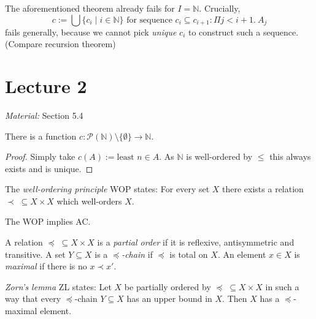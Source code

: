 \documentclass{whrartcl}
\newcommand{\NN}{\mathbb{N}}
\newcommand{\pow}{\mathcal{P}}
\begin{document}
\begin{remark}
  The aforementioned theorem already fails for $I = \NN$. Crucially,
  \[
    c := \bigcup \{c_i \mid i \in \NN\} \text{ for sequence } c_i \subseteq c_{i +
    1} : \Pi j < i + 1.~A_j
  \]
  fails generally, because we cannot pick \emph{unique} $c_i$ to construct such
  a sequence. (Compare recursion theorem)
\end{remark}


\newpage

\section{Lecture 2}

\emph{Material:} Section 5.4

\begin{theorem}
  There is a function $c : \pow(\NN) \setminus \{\emptyset\} \to \NN$.
\end{theorem}
\begin{proof}
  Simply take $c(A) := \text{least } n \in A$. As $\NN$ is well-ordered by
  $\leq$ this always exists and is unique.
\end{proof}


\begin{definition}
  The \emph{well-ordering principle} WOP states: For every set $X$ there exists
  a relation $\prec\; \subseteq X \times X$ which well-orders $X$.
\end{definition}

\begin{corollary}
  The WOP implies AC.
\end{corollary}


\begin{definition}
  A relation $\preceq\; \subseteq X \times X$ is a \emph{partial order} if it is
  reflexive, antisymmetric and transitive. A set $Y \subseteq X$ is a
  \emph{$\preceq$-chain} if $\preceq$ is total on $X$. An element $x \in X$ is
  \emph{maximal} if there is no $x \prec x'$.
\end{definition}

\begin{definition}
  \emph{Zorn's lemma} ZL states: Let $X$ be partially ordered by $\preceq\;
  \subseteq X \times X$ in such a way that every $\preceq$-chain $Y \subseteq X$
  has an upper bound in $X$. Then $X$ has a $\preceq$-maximal element.
\end{definition}
\end{document}
